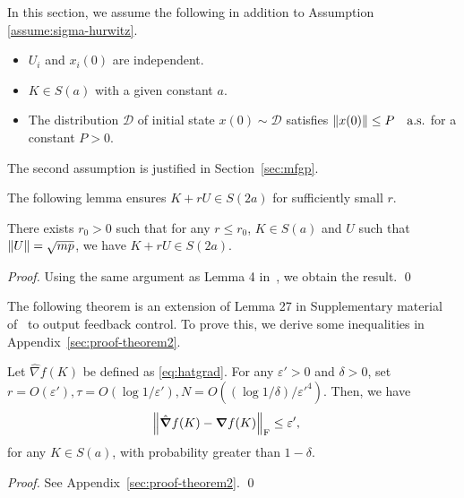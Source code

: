 In this section, we assume the following in addition to Assumption \ref{assume:sigma-hurwitz}.
\begin{assumption}\label{assume:gradest}
  \indent
  \begin{itemize}
    \item ${U}_i$ and $x_i(0)$ are independent.
    \item $K\in S(a)$ with a given constant $a$.
    \item The distribution $\mathcal D$ of initial state $x(0) \sim \mathcal{D}$ satisfies $\norm{x(0)}\leq P\quad \text{a.s.}$ for a constant $P > 0$.
  \end{itemize}
\end{assumption}
The second assumption is justified in Section~\ref{sec:mfgp}.


The following lemma ensures $K+rU \in S(2a)$ for sufficiently small $r$.
\begin{lemma}
  \label{lem:smallr}
  There exists $r_0  > 0$ such that
  for any $r \leq r_0$, $K\in S(a)$ and $U$ such that $\norm{U} = \sqrt{mp}$, we have $K+rU\in S(2a)$.
\end{lemma}
\begin{proof}
Using the same argument as Lemma 4 in~\cite{mohammadi2021convergence}, we obtain the result. \qed
\end{proof}

The following theorem is an extension of Lemma 27 in Supplementary material of~\cite{fazel2018global} 
to output feedback control.
To prove this, we derive some inequalities in Appendix~\ref{sec:proof-theorem2}.

\begin{theorem}\label{thm:totalerror}
Let $\hat{\nabla} f(K)$ be defined as \eqref{eq:hatgrad}.
  For any $\varepsilon' > 0$ and $\delta > 0$, set $r = O(\varepsilon'), \tau = O(\log 1/\varepsilon'), N = O((\log 1/\delta)/\varepsilon'^4)$. Then, we have
  \begin{align}
    &\norm{\hat \grad f(K)-\grad f(K)}_\mathrm{F} \leq \varepsilon' \label{eq:high-probability},
  \end{align}
  for any $K\in S(a)$,
  with probability greater than $1-\delta$.
\end{theorem}
\begin{proof}
  See Appendix~\ref{sec:proof-theorem2}. \qed
\end{proof}

